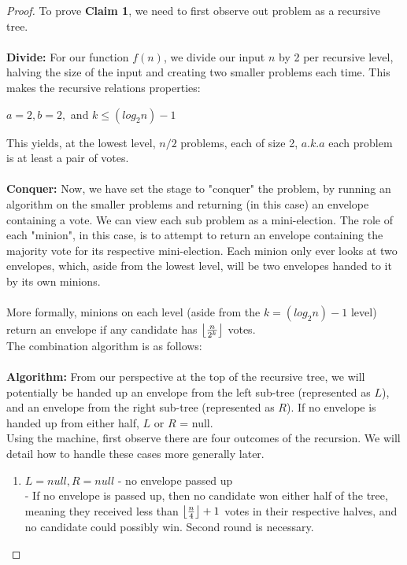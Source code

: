 \documentclass[11pt]{article}
\DeclarePairedDelimiter\floor{\lfloor}{\rfloor}
\begin{document}
\begin{proof} To prove \textbf{Claim 1}, we need to first observe out problem as a recursive tree.\\
\\
\textbf{Divide: }
For our function $f(n)$, we divide our input $n$ by 2 per recursive level, halving the size of the input and creating two smaller problems each time. This makes the recursive relations properties: 
\begin{center}
	$a = 2, b = 2,$ and $k \leq (log_2 n) -1$\\
\end{center}
This yields, at the lowest level, $n/2$ problems, each of size 2, $a.k.a$ each problem is at least a pair of votes.\\
\\
\textbf{Conquer:}
Now, we have set the stage to "conquer" the problem, by running an algorithm on the smaller problems and returning (in this case) an envelope containing a vote. We can view each sub problem as a mini-election. The role of each "minion", in this case, is to attempt to return an envelope containing the majority vote for its respective mini-election. Each minion only ever looks at two envelopes, which, aside from the lowest level, will be two envelopes handed to it by its own minions.\\
\\
More formally, minions on each level (aside from the $k = (log_2 n) - 1$ level) return an envelope if any candidate has $\floor*{\frac{n}{2^k}}$ votes.\\
The combination algorithm is as follows:\\
\\
\textbf{Algorithm:}
From our perspective at the top of the recursive tree, we will potentially be handed up an envelope from the left sub-tree (represented as $L$), and an envelope from the right sub-tree (represented as $R$). If no envelope is handed up from either half, $L$ or $R$ = null.\\
Using the machine, first observe there are four outcomes of the recursion. We will detail how to handle these cases more generally later.
\begin{enumerate}
\item $L = null, R = null$ - no envelope passed up\\
	- If no envelope is passed up, then no candidate won either half of the tree, meaning they received less than $\floor*{\frac{n}{4}} + 1$ votes in their respective halves, and no candidate could possibly win. Second round is necessary.

\end{enumerate}
\end{proof}
\end{document}
